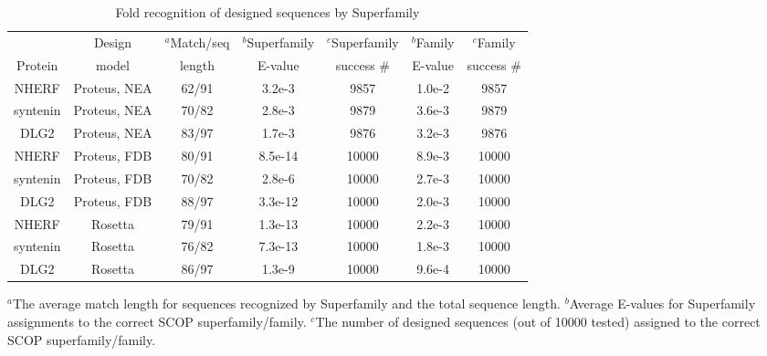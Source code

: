 \documentclass[a4paper,12pt]{article}
\begin{document}
\begin{table}[h]                            
\caption{Fold recognition of designed sequences by Superfamily}
\label{tab:superfamily}                      
\begin{center} 
\begin{tabular}{ccccccc} \hline \hline  
         & Design        & $^a$Match/seq & $^b$Superfamily & $^c$Superfamily & $^b$Family & $^c$Family  \\
Protein  & model         & length        & E-value         & success \#     & E-value    & success \#  \\ \hline
NHERF    & Proteus, NEA  & 62/91 & 3.2e-3  &  9857 & 1.0e-2 &  9857 \\ 
syntenin & Proteus, NEA  & 70/82 & 2.8e-3  &  9879 & 3.6e-3 &  9879 \\
DLG2     & Proteus, NEA  & 83/97 & 1.7e-3  &  9876 & 3.2e-3 &  9876 \\ \hline
NHERF    & Proteus, FDB  & 80/91 & 8.5e-14 & 10000 & 8.9e-3 & 10000 \\ 
syntenin & Proteus, FDB  & 70/82 & 2.8e-6  & 10000 & 2.7e-3 & 10000 \\
DLG2     & Proteus, FDB  & 88/97 & 3.3e-12 & 10000 & 2.0e-3 & 10000 \\ \hline
NHERF    & Rosetta       & 79/91 & 1.3e-13 & 10000 & 2.2e-3 & 10000 \\ 
syntenin & Rosetta       & 76/82 & 7.3e-13 & 10000 & 1.8e-3 & 10000 \\
DLG2     & Rosetta       & 86/97 & 1.3e-9  & 10000 & 9.6e-4 & 10000 \\ \hline
\end{tabular}  
\end{center} 
{\footnotesize \noindent $^a$The average match length for sequences recognized by Superfamily and the total sequence
length. $^b$Average E-values for Superfamily assignments to the correct SCOP superfamily/family. $^c$The number of
designed sequences (out of 10000 tested) assigned to the correct SCOP superfamily/family.
}
\end{table}


\clearpage
\pagebreak


\end{document}
